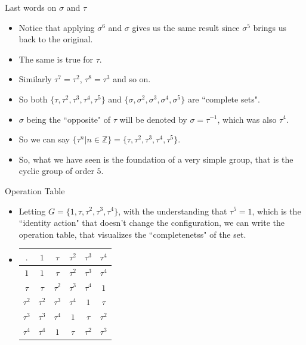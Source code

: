 \documentclass[ %
 10pt, xcolor={dvipsnames,svgnames,x11names,hyperref},
   hyperref={colorlinks=true,citecolor=green,linkcolor=DarkRed,urlcolor=ProcessBlue,anchorcolor=blue}
  ]{beamer}
\newenvironment{stepitemize}{\begin{itemize}[<+->]}{\end{itemize} }
\newcommand{\Z}{\mathbb{Z}}
\begin{document}
\begin{frame}{Last words on $\sigma$ and $\tau$}

\begin{stepitemize}
\item Notice that applying $\sigma^6$ and $\sigma$ gives us the same result since $\sigma^5$ brings us back to the original.
\item The same is true for $\tau$. 
\item Similarly $\tau^7=\tau^2$, $\tau^8=\tau^3$ and so on.
\item So both $\{\tau, \tau^2, \tau^3, \tau^4, \tau^5\}$ and 
$\{\sigma, \sigma^2, \sigma^3, \sigma^4, \sigma^5\}$ are ``complete sets".
\item $\sigma$ being the ``opposite" of $\tau$ will be denoted by $\sigma=\tau^{-1}$, which was also $\tau^4$. 
\item So we can say $\{\tau^n|n\in \Z\} = \{\tau, \tau^2, \tau^3, \tau^4, \tau^5\}$.
\item So, what we have seen is the foundation of a very simple group, that is the cyclic group of order $5$. 
\end{stepitemize}
\end{frame}
\begin{frame}{Operation Table}
\begin{stepitemize}
\item Letting $G = \{1, \tau, \tau^2, \tau^3, \tau^4\}$, with the understanding that $\tau^5=1$, which is the ``identity action" that doesn't change the configuration, we can write the operation table, that visualizes the ``completenetss" of the set.

\bigskip

\item[]
\begin{table}[H]
\begin{tabular}{ c| c | c |c|c|c}
$.$  & $1$ & $\tau$ & $\tau^2$ & $\tau^3$ & $\tau^4$ \\
\hline
$1$ & $1$ & $\tau$ & $\tau^2$ & $\tau^3$ & $\tau^4$ \\ 
\hline
$\tau$ & $\tau$ & $\tau^2$ & $\tau^3$ & $\tau^4$ & $1$ \\ 
\hline
$\tau^2$ & $\tau^2$ & $\tau^3$ & $\tau^4$ & $1$ & $\tau$ \\ 
\hline
$\tau^3$ & $\tau^3$& $\tau^4$ & $1$&$\tau$& $\tau^2$\\
\hline
$\tau^4$ & $\tau^4$& $1$ & $\tau$&$\tau^2$& $\tau^3$\\
\end{tabular}
\end{table}
\end{stepitemize}
    
\end{frame}
\end{document}
